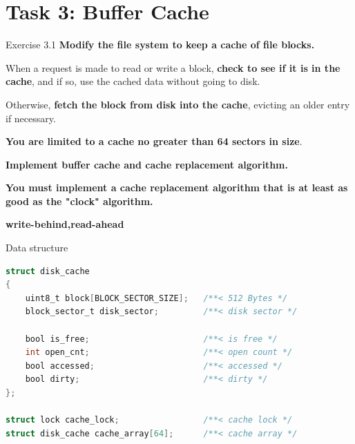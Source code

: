 \documentclass[10pt]{beamer}
\begin{document}
\section{Task 3: Buffer Cache}
\begin{frame}[fragile]{Exercise 3.1}
    \textbf{Modify the file system to keep a cache of file blocks.}

When a request is made to read or write a block, \textbf{check to see if it is in the cache}, and if so, use the cached data without going to disk.

Otherwise, \textbf{fetch the block from disk into the cache}, evicting an older entry if necessary.

\textbf{You are limited to a cache no greater than 64 sectors in size}.

\textbf{Implement buffer cache and cache replacement algorithm.}

\textbf{You must implement a cache replacement algorithm that is at least as good as the "clock" algorithm.}

\textbf{write-behind,read-ahead}
\end{frame}
\begin{frame}[fragile]{Data structure}
\begin{lstlisting}[language=C]
struct disk_cache 
{    
    uint8_t block[BLOCK_SECTOR_SIZE];   /**< 512 Bytes */
    block_sector_t disk_sector;         /**< disk sector */

    bool is_free;                       /**< is free */
    int open_cnt;                       /**< open count */
    bool accessed;                      /**< accessed */
    bool dirty;                         /**< dirty */  
};

struct lock cache_lock;                 /**< cache lock */
struct disk_cache cache_array[64];      /**< cache array */
\end{lstlisting}
\end{frame}
\end{document}
